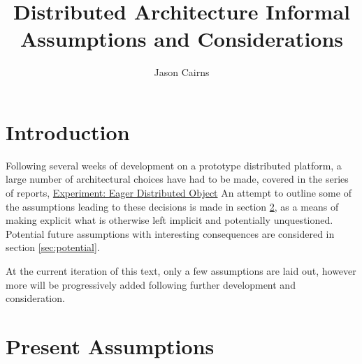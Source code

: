 \documentclass[10pt, a4paper]{article}
\newcounter{assumption}[section]
\begin{document}
\title{Distributed Architecture Informal Assumptions and Considerations}
\author{Jason Cairns}
  
\maketitle

\section{Introduction}
Following several weeks of development on a prototype distributed platform, a
large number of architectural choices have had to be made, covered in the
series of reports, \href{experiment-eager-dist-obj-supp.pdf}{Experiment: Eager
Distributed Object}
An attempt to outline some of the assumptions leading to these decisions is
made in section \ref{sec:assumptions}, as a means of making explicit what is
otherwise left implicit and potentially unquestioned.
Potential future assumptions with interesting consequences are considered in
section \ref{sec:potential}.

At the current iteration of this text, only a few assumptions are laid out,
however more will be progressively added following further development and
consideration.

\section{Present Assumptions}\label{sec:assumptions}
\end{document}

